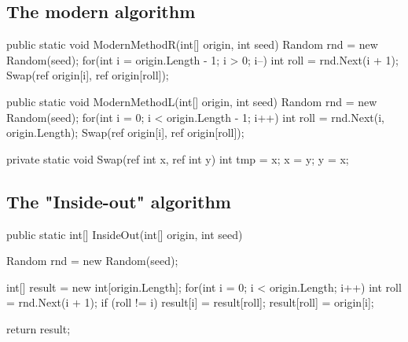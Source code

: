 \subsection{The modern algorithm}

\begin{CSharp}
        public static void ModernMethodR(int[] origin, int seed)
        {
            Random rnd = new Random(seed);
            for(int i = origin.Length - 1; i > 0; i--)
            {
                int roll = rnd.Next(i + 1);
                Swap(ref origin[i], ref origin[roll]);
            }
        }

        public static void ModernMethodL(int[] origin, int seed)
        {
            Random rnd = new Random(seed);
            for(int i = 0; i < origin.Length - 1; i++)
            {
                int roll = rnd.Next(i, origin.Length);
                Swap(ref origin[i], ref origin[roll]);
            }
        }


        private static void Swap(ref int x, ref int y)
        {
            int tmp = x;
            x = y;
            y = x;
        }
\end{CSharp}

\subsection{The "Inside-out" algorithm}

\begin{CSharp}
        public static int[] InsideOut(int[] origin, int seed)
        {
            Random rnd = new Random(seed);

            int[] result = new int[origin.Length];
            for(int i = 0; i < origin.Length; i++)
            {
                int roll = rnd.Next(i + 1);
                if (roll != i)
                {
                    result[i] = result[roll];
                }
                result[roll] = origin[i];
            }

            return result;
        }
\end{CSharp}        